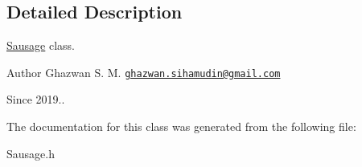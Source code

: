 \subsection{Detailed Description}
\hyperlink{classSausage}{Sausage} class.

\begin{DoxyAuthor}{Author}
Ghazwan S. M. \href{mailto:ghazwan.sihamudin@gmail.com}{\tt ghazwan.\+sihamudin@gmail.\+com} 
\end{DoxyAuthor}
\begin{DoxySince}{Since}
2019.. 
\end{DoxySince}


The documentation for this class was generated from the following file\+:\begin{DoxyCompactItemize}
\item 
Sausage.\+h\end{DoxyCompactItemize}
